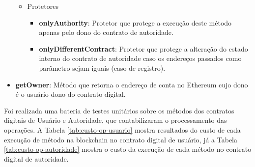 \documentclass[tcc,capa]{texufpel}
\begin{document}
\begin{itemize}
\begin{itemize}
            \item Protetores
            \begin{itemize}
                \item \textbf{onlyAuthority}: Protetor que protege a execução deste método apenas pelo dono do contrato de autoridade.
                \item \textbf{onlyDifferentContract}: Protetor que protege a alteração do estado interno do contrato de autoridade caso os endereços passados como parâmetro sejam iguais (caso de registro).
            \end{itemize}
        \end{itemize}
        
        \item \textbf{getOwner}: Método que retorna o endereço de conta no Ethereum cujo dono é o usuário dono do contrato digital.
    \end{itemize}
    
    Foi realizada uma bateria de testes unitários sobre os métodos dos contratos digitais de Usuário e Autoridade, que contabilizaram o processamento das operações. A Tabela \ref{tab:custo-op-usuario} mostra resultados do custo de cada execução de método na blockchain no contrato digital de usuário, já a Tabela \ref{tab:custo-op-autoridade} mostra o custo da execução de cada método no contrato digital de autoridade.
    
\end{document}
